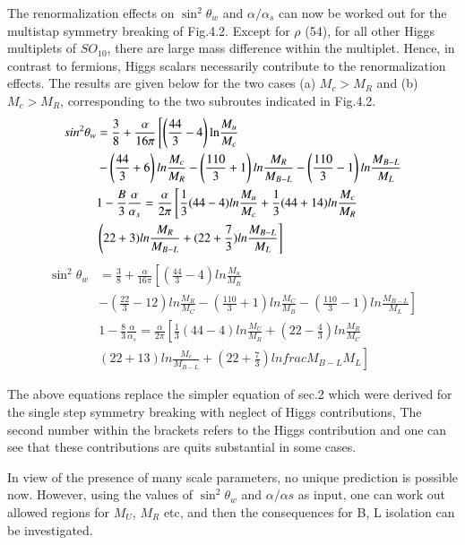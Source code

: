 The renormalization effects on $\sin^{2}\theta_{w}$ and $\alpha /\alpha_{s}$ can now be worked out for the multistap symmetry breaking of Fig.4.2. Except for $\rho$ (54), for all other Higgs multiplets of $SO_{10}$, there are large mass difference within the multiplet. Hence, in contrast to fermions, Higgs scalars necessarily contribute to the renormalization effects. The results are given below for the two cases (a) $M_{c} > M_{R}$ and (b) $M_{c}> M_{R}$, corresponding to the two subroutes indicated in Fig.4.2.
\begin{align*}
sin^{2} \theta_{w} &= \frac{3}{8} + \frac{\alpha}{16 \pi} \left[ \left(\frac{44}{3}-4 \right) {\rm ln} \frac{M_{u}}{M_{c}}\right.\\
& - \left(\frac{44}{3} + 6 \right) ln \frac{M_{c}}{M_{R}} - \left(\frac{110}{3} + 1\right)ln \frac{M_{R}}{M_{B-L}} - \left(\frac{110}{3}-1 \right)ln \frac{M_{B-L}}{M_{L}}\\
&1-\frac{B}{3} \frac{\alpha}{\alpha_{s}}= \frac{\alpha}{2\pi} \left[\frac{1}{3} (44-4) ln \frac{M_{u}}{M_{c}} + \frac{1}{3} (44 + 14) ln \frac{M_{c}}{M_{R}}\right.\\
&\left (22 + 3) ln \frac{M_{R}}{M_{B-L}} + (22 + \frac{7}{3}) ln \frac{M_{B-L}}{M_{L}}\right]
 \end{align*}
\begin{align*}
\sin^{2}\theta_{w} &= \frac{3}{8} + \frac{\alpha}{16 \pi} \left[ \left(\frac{44}{3}-4\right) ln \frac{M_{u}}{M_{R}}\right.\\
 &-\left.\left(\frac{22}{3} -12 \right) ln \frac{M_{R}}{M_{C}} - \left(\frac{110}{3} + 1 \right) ln \frac{M_{C}}{M_{B}} - \left(\frac{110}{3}-1\right) ln \frac{M_{B-L}}{M_{L}}\right]\\ 
 & 1-\frac{8}{3} \frac{\alpha}{\alpha_{s}} = \frac{\alpha}{2\pi} \left[ \frac{1}{3} (44-4) ln \frac{M_{U}}{M_{R}} + \left(22- \frac{4}{3} \right) ln \frac{M_{R}}{M_{C}}\right.\\
 &\left. (22 + 13) ln  \frac{M_{c}}{M_{B-L}} + \left(22  + \frac{7}{3}\right) ln frac{M_{B-L}}{M_{L}}\right]
\end{align*}

The above equations replace the simpler equation of sec.2 which were derived for the single step symmetry breaking with neglect of Higgs contributions, The second number within the brackets refers to the Higgs contribution and one can see that these contributions are quits substantial in some cases.

In view of the presence of many scale parameters, no unique prediction is possible now. However, using the values of $\sin^{2}\theta_{w}$ and $\alpha/\alpha s$ as input, one can work out allowed regions for $M_{U}$, $M_{R}$ etc, and then the consequences for B, L isolation can be investigated.

